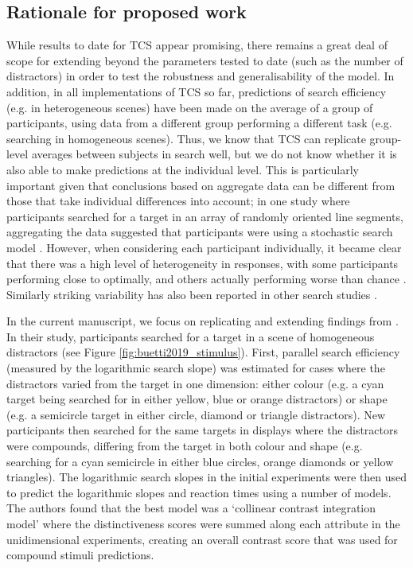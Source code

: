 \documentclass[preprint,12pt,authoryear]{elsarticle}
\begin{document}
\subsection{Rationale for proposed work}

While results to date for TCS appear promising, there remains a great deal of scope for extending beyond the parameters tested to date (such as the number of distractors) in order to test the robustness and generalisability of the model. In addition, in all implementations of TCS so far, predictions of search efficiency (e.g. in heterogeneous scenes) have been made on the average of a group of participants, using data from a different group performing a different task (e.g. searching in homogeneous scenes). Thus, we know that TCS can replicate group-level averages between subjects in search well, but we do not know whether it is also able to make predictions at the individual level. This is particularly important given that conclusions based on aggregate data can be different from those that take individual differences into account; in one study where participants searched for a target in an array of randomly oriented line segments, aggregating the data suggested that participants were using a stochastic search model \citep{nowakowska2017human}. However, when considering each participant individually, it became clear that there was a high level of heterogeneity in responses, with some participants performing close to optimally, and others actually performing worse than chance \citep{nowakowska2017human}. Similarly striking variability has also been reported in other search studies \citep{irons2016choosing, irons2018characterizing, clarke2020stable}. 

In the current manuscript, we focus on replicating and extending findings from \cite{buetti2019predicting}. In their study, participants searched for a target in a scene of homogeneous distractors (see Figure \ref{fig:buetti2019_stimulus}). First, parallel search efficiency (measured by the logarithmic search slope) was estimated for cases where the distractors varied from the target in one dimension: either colour (e.g. a cyan target being searched for in either yellow, blue or orange distractors) or shape (e.g. a semicircle target in either circle, diamond or triangle distractors). New participants then searched for the same targets in displays where the distractors were compounds, differing from the target in both colour and shape (e.g. searching for a cyan semicircle in either blue circles, orange diamonds or yellow triangles). The logarithmic search slopes in the initial experiments were then used to predict the logarithmic slopes and reaction times using a number of models. The authors found that the best model was a `collinear contrast integration model' where the distinctiveness scores were summed along each attribute in the unidimensional experiments, creating an overall contrast score that was used for compound stimuli predictions.
\end{document}
